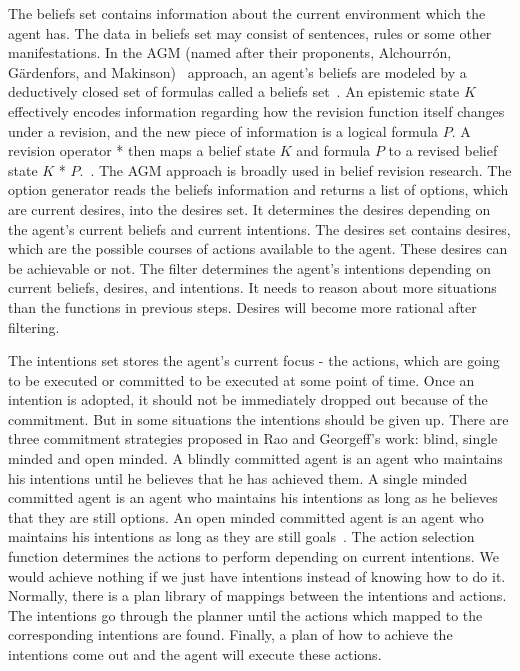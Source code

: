 The beliefs set contains information about the current environment which the agent has.
The data in beliefs set may consist of sentences, rules or some other manifestations.
In the AGM (named after their proponents, Alchourrón, Gärdenfors, and Makinson)~\cite{alchourron_revision_1985} approach, an agent's beliefs are modeled by a deductively closed set of formulas called a beliefs set~\cite{James_revise_2011}.
An epistemic state $K$ effectively encodes information regarding how the revision function itself changes under a revision, and the new piece of information is a logical formula $P$.
A revision operator * then maps a belief state $K$ and formula $P$ to a revised belief state $K$ * $P$.~\cite{James_revise_2011}.
The AGM approach is broadly used in belief revision research.
The option generator reads the beliefs information and returns a list of options, which are current desires, into the desires set.
It determines the desires depending on the agent's current beliefs and current intentions.
The desires set contains desires, which are the possible courses of actions available to the agent.
These desires can be achievable or not.
The filter determines the agent's intentions depending on current beliefs, desires, and intentions.
It needs to reason about more situations than the functions in previous steps.
Desires will become more rational after filtering.

The intentions set stores the agent's current focus - the actions, which are going to be executed or committed to be executed at some point of time.
Once an intention is adopted, it should not be immediately dropped out because of the commitment.
But in some situations the intentions should be given up.
There are three commitment strategies proposed in Rao and Georgeff's work: blind, single minded and open minded.
A blindly committed agent is an agent who maintains his intentions until he believes that he has achieved them.
A single minded committed agent is an agent who maintains his intentions as long as he believes that they are still options.
An open minded committed agent is an agent who maintains his intentions as long as they are still goals~\cite{Roberto_BDIATL_2005}.
The action selection function determines the actions to perform depending on current intentions.
We would achieve nothing if we just have intentions instead of knowing how to do it.
Normally, there is a plan library of mappings between the intentions and actions.
The intentions go through the planner until the actions which mapped to the corresponding intentions are found.
Finally, a plan of how to achieve the intentions come out and the agent will execute these actions.

